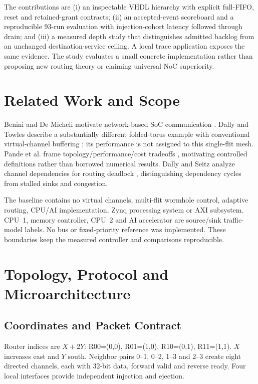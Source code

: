 \documentclass[conference,a4paper]{IEEEtran}
\begin{document}
The contributions are (i) an inspectable VHDL hierarchy with explicit full-FIFO, reset and retained-grant contracts; (ii) an accepted-event scoreboard and a reproducible 93-run evaluation with injection-cohort latency followed through drain; and (iii) a measured depth study that distinguishes admitted backlog from an unchanged destination-service ceiling. A local trace application exposes the same evidence. The study evaluates a small concrete implementation rather than proposing new routing theory or claiming universal NoC superiority.

\section{Related Work and Scope}
Benini and De Micheli motivate network-based SoC communication \cite{benini2002}. Dally and Towles describe a substantially different folded-torus example with conventional virtual-channel buffering \cite{dally2001}; its performance is not assigned to this single-flit mesh. Pande et al. frame topology/performance/cost tradeoffs \cite{pande2005}, motivating controlled definitions rather than borrowed numerical results. Dally and Seitz analyze channel dependencies for routing deadlock \cite{dally1987}, distinguishing dependency cycles from stalled sinks and congestion.

The baseline contains no virtual channels, multi-flit wormhole control, adaptive routing, CPU/AI implementation, Zynq processing system or AXI subsystem. CPU~1, memory controller, CPU~2 and AI accelerator are source/sink traffic-model labels. No bus or fixed-priority reference was implemented. These boundaries keep the measured controller and comparisons reproducible.
\section{Topology, Protocol and Microarchitecture}
\subsection{Coordinates and Packet Contract}
Router indices are $X+2Y$: R00=(0,0), R01=(1,0), R10=(0,1), R11=(1,1). $X$ increases east and $Y$ south. Neighbor pairs 0--1, 0--2, 1--3 and 2--3 create eight directed channels, each with 32-bit data, forward valid and reverse ready. Four local interfaces provide independent injection and ejection.
\end{document}
